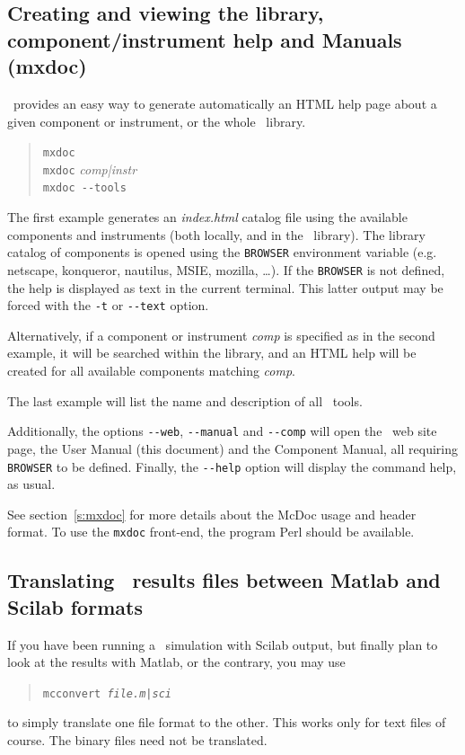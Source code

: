 \subsection{Creating and viewing the library, component/instrument help and Manuals (mxdoc)}
\label{s:mxdoc-run}

\MCX\ provides an easy way to generate automatically an HTML help page about a given component or instrument, or the whole \MCX\ library. 
\begin{quote}
  \verb|mxdoc|\\
  \verb|mxdoc| \textit{comp|instr}\\
  \verb|mxdoc --tools|
\end{quote}
The first example generates an \textit{index.html} catalog file using the available components and instruments (both locally, and in the \MCX\ library). The library catalog of components is opened using the \verb+BROWSER+ environment variable  (e.g. netscape, konqueror, nautilus, MSIE, mozilla, \ldots). If the \verb+BROWSER+ is not defined, the help is displayed as text in the current terminal. This latter output may be forced with the \verb+-t+ or \verb+--text+ option.

Alternatively, if a component or instrument \textit{comp} is specified as in the second example, it will be searched within the library, and an HTML help will be created for all available components matching \textit{comp}.

The last example will list the name and description of all \MCX\ tools.

Additionally, the options \verb+--web+, \verb+--manual+ and \verb+--comp+ will open the \MCX\ web site page, the User Manual (this document) and the Component Manual, all requiring \verb+BROWSER+ to be defined. Finally, the \verb+--help+ option will display the command help, as usual.

See section~\ref{s:mxdoc} for more details about the McDoc usage and header format.
To use the \verb+mxdoc+ front-end, the program Perl should be available.

\subsection{Translating \MCX\ results files between Matlab and Scilab formats}
\label{s:mcconvert}
 

If you have been running a \MCX\ simulation with Scilab output, but finally plan to look at the results with Matlab, or the contrary, you may use
\begin{quote}
  \texttt{mcconvert \textit{file.{m|sci}\/}}
\end{quote}
to simply translate one file format to the other. This works only for text files of course. The binary files need not be translated.

